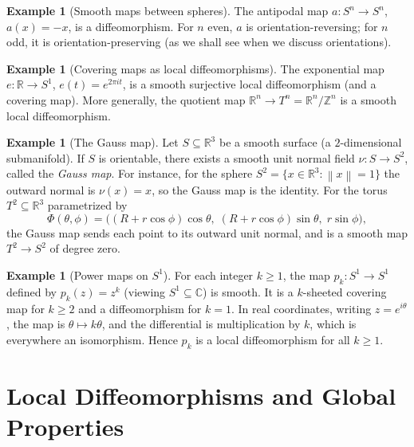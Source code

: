 \documentclass[12pt,a4paper,openany]{book}
\theoremstyle{definition}
\newtheorem{example}[theorem]{Example}
\theoremstyle{remark}
\newcommand{\Z}{\mathbb{Z}}
\newcommand{\R}{\mathbb{R}}
\newcommand{\C}{\mathbb{C}}
\newcommand{\norm}[1]{\left\lVert #1 \right\rVert}
\begin{document}
\begin{example}[Smooth maps between spheres]\label{ex:sphere-map}
The antipodal map $a \colon S^n \to S^n$, $a(x) = -x$, is a
diffeomorphism.  For $n$ even, $a$ is orientation-reversing; for $n$ odd, it
is orientation-preserving (as we shall see when we discuss orientations).
\end{example}

\begin{example}[Covering maps as local diffeomorphisms]\label{ex:covering}
The exponential map $e \colon \R \to S^1$, $e(t) = e^{2\pi i t}$, is a
smooth surjective local diffeomorphism (and a covering map).  More generally,
the quotient map $\R^n \to T^n = \R^n/\Z^n$ is a smooth local
diffeomorphism.
\end{example}

\begin{example}[The Gauss map]\label{ex:gauss-map}
Let $S \subseteq \R^3$ be a smooth surface (a $2$-dimensional submanifold).
If $S$ is orientable, there exists a smooth unit normal field
$\nu \colon S \to S^2$, called the \emph{Gauss map}.  For instance, for
the sphere $S^2 = \{x \in \R^3 : \norm{x}=1\}$ the outward normal is
$\nu(x) = x$, so the Gauss map is the identity.  For the torus
$T^2 \subseteq \R^3$ parametrized by
\[
  \Phi(\theta, \phi) = \bigl((R + r\cos\phi)\cos\theta,\;
  (R + r\cos\phi)\sin\theta,\; r\sin\phi\bigr),
\]
the Gauss map sends each point to its outward unit normal, and is a smooth
map $T^2 \to S^2$ of degree zero.
\end{example}

\begin{example}[Power maps on $S^1$]\label{ex:power-maps}
For each integer $k \geq 1$, the map $p_k \colon S^1 \to S^1$ defined by
$p_k(z) = z^k$ (viewing $S^1 \subseteq \C$) is smooth.  It is a
$k$-sheeted covering map for $k \geq 2$ and a diffeomorphism for $k = 1$.
In real coordinates, writing $z = e^{i\theta}$, the map is
$\theta \mapsto k\theta$, and the differential is multiplication by $k$,
which is everywhere an isomorphism.  Hence $p_k$ is a local diffeomorphism
for all $k \geq 1$.
\end{example}

\section{Local Diffeomorphisms and Global Properties}
\label{sec:local-diffeo}
\end{document}
